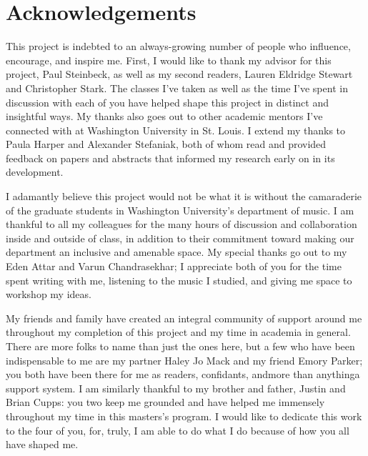 \documentclass[12pt]{report}
\begin{document}
\thispagestyle{empty}

\frenchspacing %


\setcounter{page}{2}
    \tableofcontents
    \listoffigures
    \listoftables

    \chapter*{Acknowledgements}

This project is indebted to an always-growing number of people who influence, encourage, 
and inspire me. First, I would like to thank my advisor for this project, Paul Steinbeck, 
as well as my second readers, Lauren Eldridge Stewart and Christopher Stark. The classes 
I've taken as well as the time I've spent in discussion with each of you have helped shape
this project in distinct and insightful ways. My thanks also goes out to other academic 
mentors I've connected with at Washington University in St. Louis. I extend my thanks to 
Paula Harper and Alexander Stefaniak, both of whom read and provided feedback on papers 
and abstracts that informed my research early on in its development.
 
I adamantly believe this project would not be what it is without the camaraderie of the 
graduate students in Washington University's department of music. I am thankful to all my 
colleagues for the many hours of discussion and collaboration inside and outside of class,
in addition to their commitment toward making our department an inclusive and amenable space.
My special thanks go out to my Eden Attar and Varun Chandrasekhar; I appreciate both of you
for the time spent writing with me, listening to the music I studied, and giving me space to
workshop my ideas.

My friends and family have created an integral community of support around me throughout my 
completion of this project and my time in academia in general. There are more folks to name 
than just the ones here, but a few who have been indispensable to me are my partner Haley 
Jo Mack and my friend Emory Parker; you both have been there for me as readers, confidants, 
and\textemdash more than anything\textemdash a support system. I am similarly thankful to my 
brother and father, Justin and Brian Cupps: you two keep me grounded and have helped me
immensely throughout my time in this masters's program. I would like to dedicate this work to
the four of you, for, truly, I am able to do what I do because of how you all have shaped me.
\end{document}
